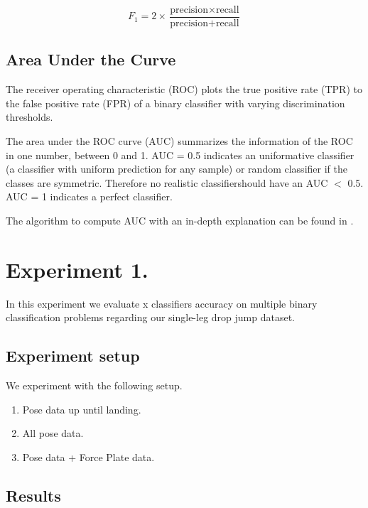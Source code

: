 \[ F_1 = 2 \times \frac{\text{precision} \times \text{recall}}{\text{precision} + \text{recall}} \]

\subsection{Area Under the Curve}
The receiver operating characteristic (ROC) plots the true positive rate (TPR) to the false positive rate (FPR) of a binary classifier with varying discrimination thresholds.

The area under the ROC curve (AUC) summarizes the information of the ROC in one number, between 0 and 1. AUC = 0.5 indicates an uniformative classifier (a classifier with uniform prediction for any sample) or random classifier if the classes are symmetric. Therefore no realistic classifiershould have an AUC $<$ 0.5. AUC = 1 indicates a perfect classifier.

The algorithm to compute AUC with an in-depth explanation can be found in \cite{Fawcett2006AnAnalysis}.

\section{Experiment 1.}
In this experiment we evaluate x classifiers accuracy on multiple binary classification problems regarding our single-leg drop jump dataset.

\subsection{Experiment setup}
We experiment with the following setup.

\begin{enumerate}[label=(\Alph*)]
  \item Pose data up until landing.
  \item All pose data.
  \item Pose data + Force Plate data.
\end{enumerate}

\subsection{Results}
\subsection{}

